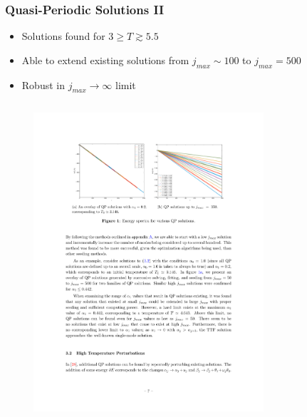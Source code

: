 \documentclass[mathserif,10pt]{beamer}
\newcommand{\bi}{\begin{itemize}}
\newcommand{\ei}{\end{itemize}}
\newcommand{\its}{\item}
\newcommand{\jm}{j_{max}}
\begin{document}
{\frame
{
  \frametitle{Quasi-Periodic Solutions II}
  \bi
  \its Solutions found for $3 \geq T \gtrsim 5.5$
  \its Able to extend existing solutions from $\jm \sim 100$ to $\jm = 500$
  \its Robust in $\jm \to \infty$ limit
  \ei
  
  \vspace{-0.1in}
  \begin{columns}
  \begin{figure}
  \centering
  \includegraphics[scale=0.9]{largejmax} 
  \end{figure}
  \begin{figure}
  \centering

\end{figure}
\end{columns}}}
\end{document}
